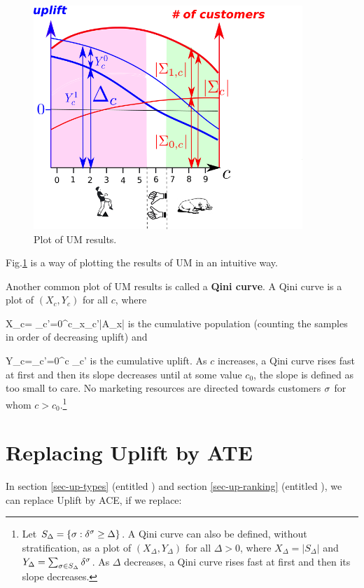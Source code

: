 \begin{figure}[h!]
\centering
\includegraphics[width=4in]
{uplift/qini-fake-up.png}

\caption{
Plot
of UM results.
} 
\label{fig-qini-fake}
\end{figure}
Fig.\ref{fig-qini-fake}
is a  way of
plotting
the results 
of UM in an
intuitive
way.


Another common plot of UM results is
called a {\bf Qini
curve}.
A Qini curve is a plot 
of $(X_c,Y_c)$
for all $c$, where

\beq
X_c= \sum_{c'=0}^{c}\sum_{x\in \calx_{c'}}|A_x|
\eeq
is the cumulative population (counting the
samples in
order of decreasing uplift) and

\beq
Y_c=\sum_{c'=0}^c \Delta_{c'}
\eeq
is the cumulative uplift.
As $c$ increases, a Qini curve rises fast at first and then its slope decreases until
at some value $c_0$, the slope is defined as too small to care. No marketing resources are
directed towards
customers $\sigma$ for whom  $c>c_0$.\footnote{
Let 
$S_{\Delta} = \{\sigma:\delta^\sigma \geq \Delta\}$.
A Qini curve can also be defined, without stratification,
as a
 plot of $(X_\Delta, Y_\Delta)$ for all $\Delta>0$,
where $
X_\Delta = |S_{\Delta}|$
and
$
Y_\Delta= \sum_{\sigma\in S_{\Delta}}\delta^\sigma
$. As $\Delta$ decreases, a Qini curve rises fast at first and then its slope decreases.
}

\section{Replacing Uplift by ATE}

In section \ref{sec-up-types} (entitled )
and section \ref{sec-up-ranking} (entitled 
),
we can replace Uplift by ACE, if we replace:

